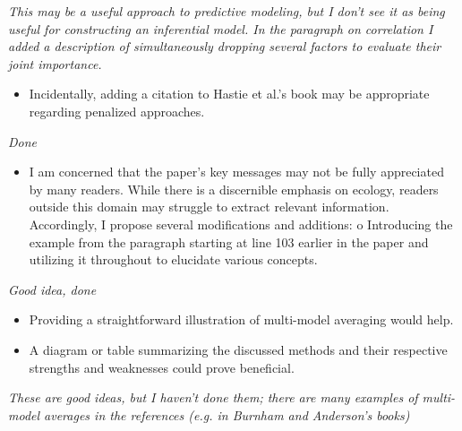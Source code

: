 \documentclass[12pt]{article}
\providecommand{\tightlist}{%
  \setlength{\itemsep}{0pt}\setlength{\parskip}{0pt}}
\begin{document}
\emph{This may be a useful approach to predictive modeling, but I don't
see it as being useful for constructing an inferential model. In the
paragraph on correlation I added a description of simultaneously
dropping several factors to evaluate their joint importance.}

\begin{itemize}
\tightlist
\item
  Incidentally, adding a citation to Hastie et al.'s book may be
  appropriate regarding penalized approaches.
\end{itemize}

\emph{Done}

\begin{itemize}
\tightlist
\item
  I am concerned that the paper's key messages may not be fully
  appreciated by many readers. While there is a discernible emphasis on
  ecology, readers outside this domain may struggle to extract relevant
  information. Accordingly, I propose several modiﬁcations and
  additions: o Introducing the example from the paragraph starting at
  line 103 earlier in the paper and utilizing it throughout to elucidate
  various concepts.
\end{itemize}

\emph{Good idea, done}

\begin{itemize}
\item Providing a straightforward illustration of multi-model averaging
would help.
\item A diagram or table summarizing the discussed methods and
their respective strengths and weaknesses could prove beneﬁcial.
\end{itemize}

\emph{These are good ideas, but I haven't done them; there are many examples of multi-model averages in the references (e.g. in Burnham and Anderson's books)}
\end{document}
